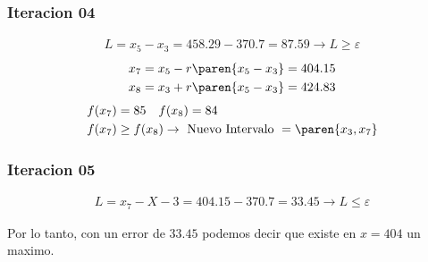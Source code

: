\begin{homeworkProblem}[-1][Hughesco]
\subsubsection{Iteracion 04}
\begin{align*}
    L=x_5-x_3=458.29-370.7=87.59 \rightarrow L \geq \varepsilon
\end{align*}
\begin{align*}
    &x_7=x_5 - r\paren{x_5-x_3}= 404.15 \\
    &x_8=x_3 + r\paren{x_5-x_3}= 424.83
\end{align*}
\begin{align*}
    &f(x_7)=85 \quad f(x_8)=84 \\
    &f(x_7) \geq f(x_8) \rightarrow \text{ Nuevo Intervalo } = \paren{x_3,x_7}
\end{align*}

\subsubsection{Iteracion 05}
\begin{align*}
    L=x_7-X-3=404.15-370.7=33.45 \rightarrow L \leq \varepsilon
\end{align*}

Por lo tanto, con un error de $33.45$ podemos decir que existe en $x=404$ un maximo.

\end{homeworkProblem}